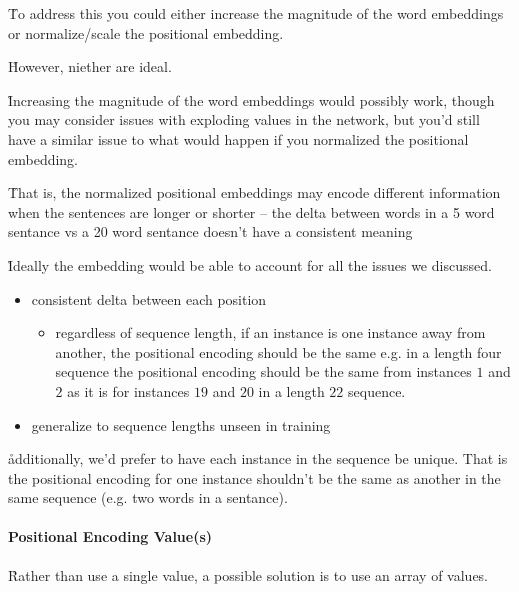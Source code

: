 \r{To address this you could either increase the magnitude of the word embeddings or normalize/scale the positional embedding.}

\r{However, niether are ideal.}

\r{Increasing the magnitude of the word embeddings would possibly work, though you may consider issues with exploding values in the network, but you'd still have a similar issue to what would happen if you normalized the positional embedding. }

\r{That is, the normalized positional embeddings may encode different information when the sentences are longer or shorter -- the delta between words in a 5 word sentance vs a 20 word sentance doesn't have a consistent meaning}


\r{Ideally the embedding would be able to account for all the issues we discussed.}

\begin{itemize}[noitemsep,topsep=0pt]
	\item consistent delta between each position
	\begin{itemize}[noitemsep,topsep=0pt]
		\item regardless of sequence length, if an instance is one instance away from another, the positional encoding should be the same e.g. in a length four sequence the positional encoding should be the same from instances $1$ and $2$ as it is for instances $19$ and $20$ in a length $22$ sequence.
	\end{itemize}
	\item generalize to sequence lengths unseen in training
\end{itemize}

\r{additionally, we'd prefer to have each instance in the sequence be unique. That is the positional encoding for one instance shouldn't be the same as another in the same sequence (e.g. two words in a sentance).}

\paragraph{Positional Encoding Value(s)}

\r{Rather than use a single value, a possible solution is to use an array of values.}



